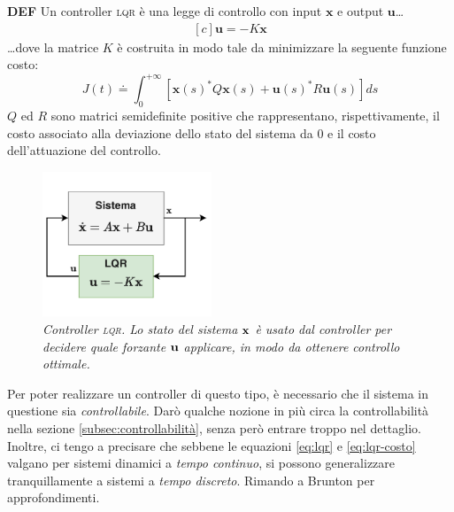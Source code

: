 \begin{framed}
  \textbf{DEF}
  Un controller \textsc{lqr} è una legge di controllo con input $\mathbf x$ e output $\mathbf u$\ldots
  \begin{equation}
    \begin{aligned}[c]
      \mathbf u = -K \mathbf x
    \end{aligned}
    \label{eq:lqr}
  \end{equation}
  \ldots dove la matrice $K$ è costruita in modo tale da minimizzare la seguente funzione costo:
  \begin{equation}
    J(t) \doteq
      \int_0^{+\infty} \left[ \mathbf{x} (s)^* Q \mathbf {x} (s) + \mathbf {u} (s)^* R \mathbf {u} (s) \right] ds
    \label{eq:lqr-costo}
  \end{equation}
  $Q$ ed $R$ sono matrici semidefinite positive che rappresentano, rispettivamente, il costo associato alla
  deviazione dello stato del sistema da $0$ e il costo dell'attuazione del controllo.
\end{framed}

\begin{figure}[H]
  \centering
  \includegraphics[width=0.45\textwidth]{../assets/diagramma lqr.pdf}
  \caption{\emph{Controller \textsc{lqr}. Lo stato del sistema $\bf x$ è usato dal controller per decidere quale forzante
  $\bf u$ applicare, in modo da ottenere controllo ottimale.}}
  \label{fig:lqr}
\end{figure}

Per poter realizzare un controller di questo tipo, è necessario che il sistema in questione sia \emph{controllabile}.
Darò qualche nozione in più circa la controllabilità nella sezione \ref{subsec:controllabilità}, senza però entrare
troppo nel dettaglio.
Inoltre, ci tengo a precisare che sebbene le equazioni \eqref{eq:lqr} e \eqref{eq:lqr-costo}
valgano per sistemi dinamici a \emph{tempo continuo}, si possono generalizzare tranquillamente a sistemi
a \emph{tempo discreto}.
Rimando a Brunton\cite{brunton2019data} per approfondimenti.

